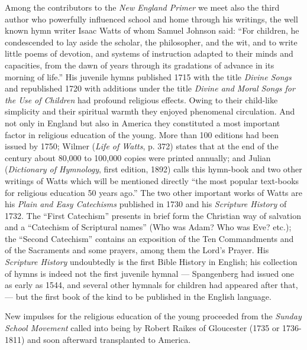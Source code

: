 Among the contributors to the \emph{\emph{New England Primer}}
we meet also the third author who powerfully influenced school and home through his writings, the well known hymn writer Isaac Watts of whom Samuel Johnson said: “For children, he condescended to lay aside the scholar, the philosopher, and the wit, and to write little poems of devotion, and systems of instruction adapted to their minds and capacities, from the dawn of years through its gradations of advance in its morning of life.” His juvenile hymns published 1715 with the title \emph{Divine Songs} and republished 1720 with additions under the title \emph{Divine and Moral Songs for the Use of Children} had profound religious effects. Owing to their child-like simplicity and their spiritual warmth they enjoyed phenomenal circulation. And not only in England but also in America they constituted a most important factor in religious education of the young. More than 100 editions had been issued by 1750; Wilmer (\emph{Life of Watts}, p. 372) states that at the end of the century about 80,000 to 100,000 copies were printed annually; and Julian (\emph{Dictionary of Hymnology}, first edition, 1892) calls this hymn-book and two other writings of Watts which will be mentioned directly “the most popular text-books for religious education 50 years ago.” The two other important works of Watts are his \emph{Plain and Easy Catechisms} published in 1730 and his \emph{Scripture History} of 1732. The “First Catechism” presents in brief form the Christian way of salvation and a “Catechism of Scriptural names” (Who was Adam? Who was Eve? etc.); the “Second Catechism” contains an exposition of the Ten Commandments and of the Sacraments and some prayers, among them the Lord’s Prayer. His \emph{Scripture History} undoubtedly is the first Bible History in English; his collection of hymns is indeed not the first juvenile hymnal — Spangenberg had issued one as early as 1544, and several other hymnals for children had appeared after that, — but the first book of the kind to be published in the English language.

New impulses for the religious education of the young proceeded from the \emph{Sunday School Movement} called into being by Robert Raikes of Gloucester (1735 or 1736-1811) and soon afterward transplanted to America.


